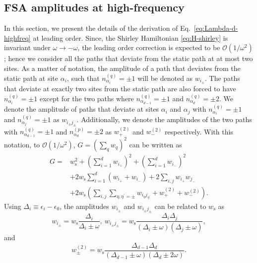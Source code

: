 \documentclass[aps,prl,twocolumn,superscriptaddress,nobalancelastpage,longbibliography]{revtex4-2}
\begin{document}
\subsection{FSA amplitudes at high-frequency}
In this section, we present the details of the derivation of Eq.~\ref{eq:Lambda-d-highfreq} at leading order.
Since, the Shirley Hamiltonian \eqref{eq:H-shirley} is invariant under $\omega\to-\omega$, the leading order correction is expected to be $\mathcal{O}(1/\omega^2)$; hence we consider all the paths that deviate from the static path at at most two sites.
As a matter of notation, the amplitude  of a path that deviates from the static path at site $\alpha_i$, such that $n_{\alpha_i}^{(q)}=\pm 1$ will be denoted as $w_{i_\pm}$. 
The paths that deviate at exactly two sites from the static path are also forced to have $n_{\alpha_i}^{(q)}=\pm 1$ except for the two paths where $n_{\alpha_{d-1}}^{(q)}=\pm 1$ and $n_{\alpha_d}^{(q)}=\pm 2$. 
We denote the amplitude of paths that deviate at sites $\alpha_i$ and $\alpha_j$ with $n_{\alpha_i}^{(q)}=\pm 1$ and $n_{\alpha_j}^{(q)}=\pm 1$ as $w_{i_\pm j_\pm}$. Additionally, we denote the amplitudes of the two paths with $n_{\alpha_{d-1}}^{(q)}=\pm 1$ and $n_{\alpha_d}^{(p)}=\pm 2$ as $w_+^{(2)}$ and ${w}_-^{(2)}$ respectively. With this notation, to $\mathcal{O}(1/\omega^2)$, $G=(\sum_{q}w_q)^2$ can be written as 
\begin{subequations}
\begin{align}
G =& w_\mathrm{s}^2 +  (\sum_{i=1}^d w_{i_+})^2 + (\sum_{i=1}^d w_{i_-})^2  \label{eq:Gd1}\\
&+2 w_\mathrm{s}\sum_{i=1}^d(w_{i_+}+w_{i_-}) +2\sum_{i,j}w_{i_+}w_{j_-}\label{eq:Gd2}\\
&+2w_\mathrm{s}\left(\sum_{i,j}\sum_{\eta,\eta^\prime=\pm}w_{i_\eta j_{\eta^\prime}}+w_+^{(2)}+w_-^{(2)}\right).
\label{eq:Gd3}
\end{align}
\label{eq:G-det}
\end{subequations}
Using $\Delta_i\equiv\epsilon_i-\epsilon_0$, the amplitudes $w_{i_\pm}$ and $w_{i_\pm j_\pm}$ can be related to $w_\mathrm{s}$ as 
\begin{equation}
w_{i_\pm} = w_\mathrm{s}\frac{\Delta_i}{\Delta_i\pm\omega},~w_{i_\pm j_\pm} = w_\mathrm{s}\frac{\Delta_i\Delta_j}{(\Delta_i\pm\omega)(\Delta_j\pm\omega)},
\label{eq:w12-amp}
\end{equation}
and 
\begin{equation}
w^{(2)}_\pm = w_\mathrm{s}\frac{\Delta_{d-1}\Delta_d}{(\Delta_{d-1}\pm\omega)(\Delta_{d}\pm2\omega)}.
\label{eq:w2-amp}
\end{equation}
\end{document}
